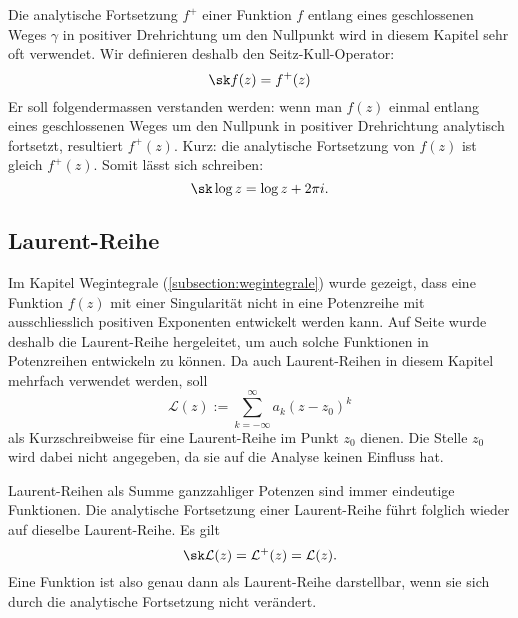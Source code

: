 Die analytische Fortsetzung $f^+$ einer Funktion $f$ entlang eines geschlossenen Weges $\gamma$ in positiver Drehrichtung um den Nullpunkt wird in diesem Kapitel sehr oft verwendet.
Wir definieren deshalb den Seitz-Kull-Operator:
\[\sk f(z)= f^+(z)\]
Er soll folgendermassen verstanden werden: wenn man $f(z)$ einmal entlang eines geschlossenen Weges um den Nullpunk in positiver Drehrichtung analytisch fortsetzt, resultiert $f^+(z)$.
Kurz: die analytische Fortsetzung von $f(z)$ ist gleich $f^+(z)$.
Somit lässt sich schreiben: 
\[\sk \log z = \log z + 2\pi i.\]

\subsection{Laurent-Reihe}
Im Kapitel Wegintegrale (\ref{subsection:wegintegrale}) wurde gezeigt, dass eine Funktion $f(z)$ mit einer Singularität nicht in eine Potenzreihe mit ausschliesslich positiven Exponenten entwickelt werden kann.
Auf Seite \pageref{sssec:LaurentReihen} wurde deshalb die Laurent-Reihe hergeleitet, um auch solche Funktionen in Potenzreihen entwickeln zu können.
Da auch Laurent-Reihen in diesem Kapitel mehrfach verwendet werden, soll
\[\mathcal{L}(z):=\sum_{k=-\infty}^{\infty}a_k(z-z_0)^k\]
als Kurzschreibweise für eine Laurent-Reihe im Punkt $z_0$ dienen. Die Stelle $z_0$ wird dabei nicht angegeben, da sie auf die Analyse keinen Einfluss hat.

Laurent-Reihen als Summe ganzzahliger Potenzen sind immer eindeutige Funktionen.
Die analytische Fortsetzung einer Laurent-Reihe führt folglich wieder auf dieselbe Laurent-Reihe.
Es gilt
\[\sk \mathcal{L}(z)=\mathcal{L}^+(z)=\mathcal{L}(z).\]
Eine Funktion ist also genau dann als Laurent-Reihe darstellbar, wenn sie sich durch die analytische Fortsetzung nicht verändert.

